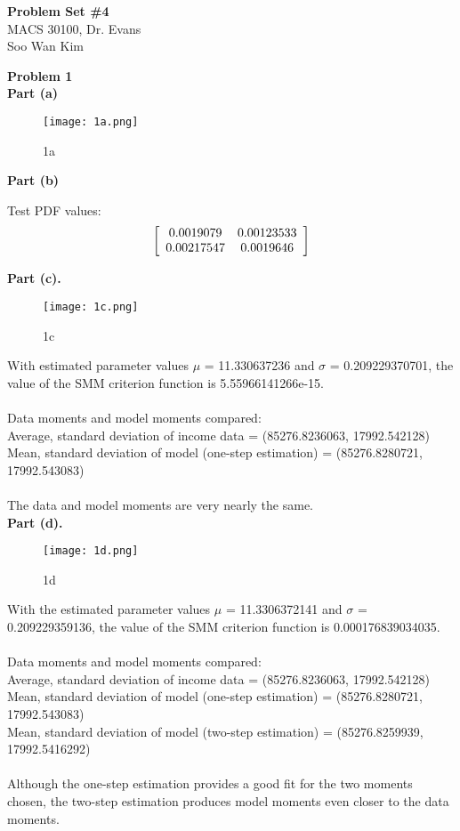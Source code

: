 \documentclass[letterpaper,12pt]{article}
\theoremstyle{definition}
\begin{document}
\begin{flushleft}
  \textbf{\large{Problem Set \#4}} \\
  MACS 30100, Dr. Evans \\
  Soo Wan Kim
\end{flushleft}

\noindent\textbf{Problem 1} \\
\textbf {Part (a)}

\begin{figure}[h!]
  \texttt{[image: 1a.png]}
  \caption{1a}
\end{figure}

\noindent
\textbf {Part (b)} 

\noindent
Test PDF values: \\
$$ \left[
\begin{array}{c c}
0.0019079 		& 		 0.00123533 \\
0.00217547 		& 		0.0019646 \\
\end{array} \right] 
$$

\noindent\textbf {Part (c).} 

\begin{figure}[h!]
  \texttt{[image: 1c.png]}
  \caption{1c}
\end{figure}

\noindent
With estimated parameter values $\mu$ = 11.330637236 and $\sigma$ = 0.209229370701, the value of the SMM criterion function is 5.55966141266e-15.\\\\
Data moments and model moments compared:\\
Average, standard deviation of income data = (85276.8236063, 17992.542128)\\
Mean, standard deviation of model (one-step estimation) = (85276.8280721, 17992.543083)\\\\
\noindent
The data and model moments are very nearly the same.\\

\noindent\textbf {Part (d).} \\

\begin{figure}[h!]
  \texttt{[image: 1d.png]}
  \caption{1d}
\end{figure}

\noindent
With the estimated parameter values $\mu$ = 11.3306372141 and $\sigma$ = 0.209229359136, the value of the SMM criterion function is 0.000176839034035.\\\\
Data moments and model moments compared:\\
Average, standard deviation of income data = (85276.8236063, 17992.542128)\\
Mean, standard deviation of model (one-step estimation) = (85276.8280721, 17992.543083)\\
Mean, standard deviation of model (two-step estimation) = (85276.8259939, 17992.5416292)\\\\
\noindent
Although the one-step estimation provides a good fit for the two moments chosen, the two-step estimation produces model moments even closer to the data moments.
\end{document}
